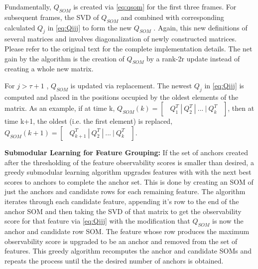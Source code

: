 \documentclass[10pt,twocolumn,letterpaper]{article}
\begin{document}
Fundamentally, $Q_{SOM}$ is created via \eqref{eq:qsom} 
for the first three frames. For subsequent frames, the SVD of $Q_{SOM}$ and combined with corresponding calculated ${Q}_{j}$ in \eqref{eq:Qjjj} to form the new $Q_{SOM}$ . Again, this new definitions of several matrices and involves diagonalization of newly constructed matrices. Please refer to the original text for the complete implementation details. The net gain by the algorithm is the creation of $Q_{SOM}$ by a rank-2r update instead of creating a whole new matrix. 

For $j>\tau + 1$ , $Q_{SOM}$ is updated via replacement. The newest ${Q}_{j}$ in \eqref{eq:Qjjj} is computed and placed in the positions occupied by the oldest elements of the matrix. As an example, if at time k, $Q_{SOM}(k) = \begin{bmatrix} \ \ Q_1^T \ | \ Q_2^T \ | \ ... \ | \ Q_k^T  \ \ \end{bmatrix}$, then at time k+1, the oldest (i.e. the first element) is replaced, ${Q}_{SOM}(k+1) = \begin{bmatrix}\ \ Q_{k+1}^T \ | \ Q_2^T \ | \ ... \ | \ Q_k^T\ \ \end{bmatrix}$.

\textbf{Submodular Learning for Feature Grouping:} If the set of anchors created after the thresholding of the feature observability scores is smaller than desired, a greedy submodular learning algorithm upgrades features with with the next best scores to anchors to complete the anchor set. This is done by creating an SOM of just the anchors and candidate rows for each remaining feature. The algorithm iterates through each candidate feature, appending it's row to the end of the anchor SOM and then taking the SVD of that matrix to get the observability score for that feature via \eqref{eq:Qjjj} with the modification that $Q_{SOM}$ is now the anchor and candidate row SOM. The feature whose row produces the maximum observability score is upgraded to be an anchor and removed from the set of features. This greedy algorithm recomputes the anchor and candidate SOMs and repeats the process until the the desired number of anchors is obtained.
\end{document}

